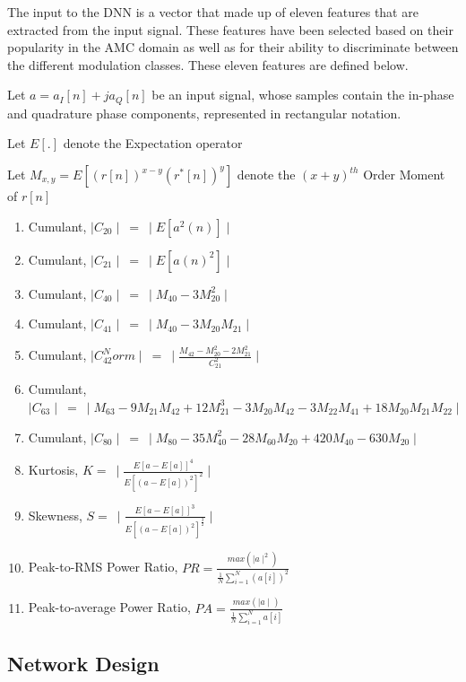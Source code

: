 \documentclass[journal,onecolumn]{IEEEtran}
\begin{document}
The input to the DNN is a vector that made up of eleven features that are extracted from the input signal. These features have been selected based on their popularity in the AMC domain as well as for their ability to discriminate between the different modulation classes. These eleven features are defined below.

Let $a=a_I[n]+ja_Q[n]$ be an input signal, whose samples contain the in-phase and quadrature phase components, represented in rectangular notation.

Let $E[.]$ denote the Expectation operator

Let $M_{x,y}=E[(r[n])^{x-y}(r^*[n])^y]$ denote the $(x+y)^{th}$ Order Moment of $r[n]$ 

\begin{enumerate}
\setlength{\itemsep}{1.2\baselineskip}
\item Cumulant, $\mid C_{20} \mid\ =\ \mid E\left[a^{2}\left(n\right)\right]\mid$
\item Cumulant, $\mid C_{21} \mid\ =\ \mid E\left[a\left(n\right)^{2}\right]\mid$
\item Cumulant, $\mid C_{40} \mid\ =\ \mid M_{40}-3M_{20}^2\mid$
\item Cumulant, $\mid C_{41} \mid\ =\ \mid M_{40}-3M_{20}M_{21}\mid$
\item Cumulant, $\mid C_{42}^Norm \mid\ =\ \mid \frac{M_{42}-M_{20}^2-2M_{21}^2}{C_{21}^2}\mid$
\item Cumulant, $\mid C_{63} \mid\ =\ \mid M_{63}-9M_{21}M_{42}+12M_{21}^3-3M_{20}M_{42}-3M_{22}M_{41}+18M_{20}M_{21}M_{22} \mid$
\item Cumulant, $\mid C_{80} \mid\ =\ \mid M_{80}-35M_{40}^2-28M_{60}M_{20}+420M_{40}-630M_{20} \mid$
\item Kurtosis, $K=\ \mid\frac{E\left[a-E\left[a\right]\right]^4}{E\left[\left(a-E\left[a\right]\right)^2\right]^{2}}\mid$ 
\item Skewness, $S=\ \mid\frac{E\left[a-E\left[a\right]\right]^3}{E\left[\left(a-E\left[a\right]\right)^2\right]^{\frac{3}{2}}}\mid$
\item Peak-to-RMS Power Ratio, $PR = \frac{max\left(\mid a \mid^2\right)}{\frac{1}{N}\sum_{i=1}^{N}\left(a[i]\right)^2}$
\item Peak-to-average Power Ratio, $PA = \frac{max\left(\mid a \mid\right)}{\frac{1}{N}\sum_{i=1}^{N}a[i]}$

\end{enumerate}

\subsection{Network Design}
\end{document}
